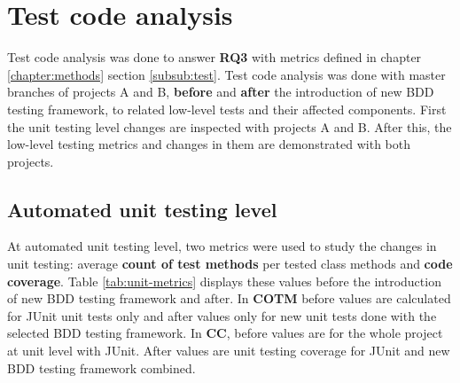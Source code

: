     \clearpage
\restoregeometry

\section{Test code analysis}
Test code analysis was done to answer \textbf{RQ3} with metrics defined in chapter \ref{chapter:methods} section \ref{subsub:test}.
Test code analysis was done with master branches of projects A and B, \textbf{before} and \textbf{after} the introduction of new BDD testing framework, to related
low-level tests and their affected components. First the unit testing level changes are inspected with projects A and B.
After this, the low-level testing metrics and changes in them are demonstrated with both projects.

\subsection{Automated unit testing level}
At automated unit testing level, two metrics were used to study the changes in unit testing: average \textbf{count of test methods}
per tested class methods and \textbf{code coverage}. Table \ref{tab:unit-metrics} displays these values before the introduction
of new BDD testing framework and after. In \textbf{COTM} before values are calculated for JUnit unit tests only and after
values only for new unit tests done with the selected BDD testing framework. In \textbf{CC}, before values are for the
whole project at unit level with JUnit. After values are unit testing coverage for JUnit and new BDD testing framework
combined.

